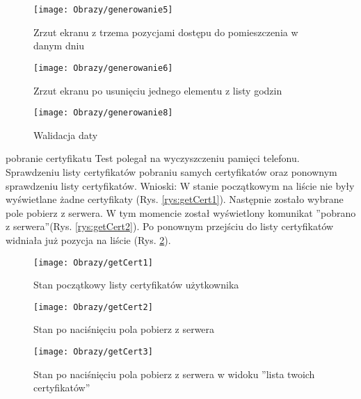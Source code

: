 \begin{enumerate*}
\begin{figure}[ht!]
		\begin{minipage}{0.2\textwidth}
		\texttt{[image: Obrazy/generowanie5]}
		\caption{Zrzut ekranu z trzema pozycjami dostępu do pomieszczenia w danym dniu }
		\label{rys:generowanie5}
	\end{minipage}
	

	\begin{minipage}{0.2\textwidth}
		\texttt{[image: Obrazy/generowanie6]}
		\caption{Zrzut ekranu po usunięciu jednego elementu z listy godzin}
		\label{rys:generowanie6}
	\end{minipage}
	
	\begin{minipage}{0.2\textwidth}
		\texttt{[image: Obrazy/generowanie8]}
		\caption{Walidacja daty}
		\label{rys:generowanie7}
	\end{minipage}

\end{figure}
	
	
	\item   pobranie certyfikatu
	Test polegał na wyczyszczeniu pamięci telefonu. Sprawdzeniu listy certyfikatów pobraniu samych certyfikatów oraz ponownym sprawdzeniu listy certyfikatów.
	Wnioski: W stanie początkowym na liście nie były wyświetlane żadne certyfikaty (Rys. \ref{rys:getCert1}). Następnie zostało wybrane pole pobierz z serwera. W tym momencie został wyświetlony komunikat ''pobrano z serwera''(Rys. \ref{rys:getCert2}). Po ponownym przejściu do listy certyfikatów widniała już pozycja na liście (Rys. \ref{rys:getCert3}).
	
		\begin{figure}[ht!]
		
		\begin{minipage}{0.2\textwidth}
			\texttt{[image: Obrazy/getCert1]}
			\caption{Stan początkowy listy certyfikatów użytkownika }
			\label{rys:getCert1}
		\end{minipage}
		
		\begin{minipage}{0.2\textwidth}
			\texttt{[image: Obrazy/getCert2]}
			\caption{Stan po naciśnięciu pola pobierz z serwera }
			\label{rys:getCert2}
		\end{minipage}
		
		
		\begin{minipage}{0.2\textwidth}
			\texttt{[image: Obrazy/getCert3]}
			\caption{Stan po naciśnięciu pola pobierz z serwera w widoku ''lista twoich certyfikatów''}
			\label{rys:getCert3}
		\end{minipage}
		

\end{figure}
\end{enumerate*}
